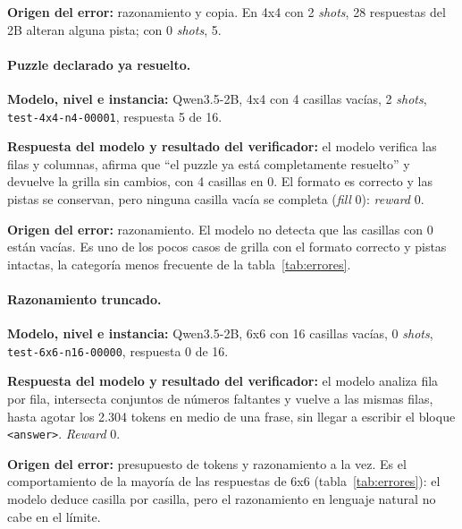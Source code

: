 \textbf{Origen del error:} razonamiento y copia. En 4x4 con 2 \emph{shots}, 28
respuestas del 2B alteran alguna pista; con 0 \emph{shots}, 5.

\paragraph{Puzzle declarado ya resuelto.}
\textbf{Modelo, nivel e instancia:} Qwen3.5-2B, 4x4 con 4 casillas vacías, 2
\emph{shots}, \texttt{test-4x4-n4-00001}, respuesta 5 de 16.

\textbf{Respuesta del modelo y resultado del verificador:} el modelo verifica las
filas y columnas, afirma que ``el puzzle ya está completamente resuelto'' y
devuelve la grilla sin cambios, con 4 casillas en 0. El formato es correcto y las
pistas se conservan, pero ninguna casilla vacía se completa (\emph{fill} 0):
\emph{reward} 0.

\textbf{Origen del error:} razonamiento. El modelo no detecta que las casillas
con 0 están vacías. Es uno de los pocos casos de grilla con el formato correcto
y pistas intactas, la categoría menos frecuente de la tabla~\ref{tab:errores}.

\paragraph{Razonamiento truncado.}
\textbf{Modelo, nivel e instancia:} Qwen3.5-2B, 6x6 con 16 casillas vacías, 0
\emph{shots}, \texttt{test-6x6-n16-00000}, respuesta 0 de 16.

\textbf{Respuesta del modelo y resultado del verificador:} el modelo analiza fila
por fila, intersecta conjuntos de números faltantes y vuelve a las mismas filas,
hasta agotar los 2.304 tokens en medio de una frase, sin llegar a escribir el bloque
\texttt{<answer>}. \emph{Reward} 0.

\textbf{Origen del error:} presupuesto de tokens y razonamiento a la vez. Es el
comportamiento de la mayoría de las respuestas de 6x6 (tabla~\ref{tab:errores}):
el modelo deduce casilla por casilla, pero el razonamiento en lenguaje natural no
cabe en el límite.
